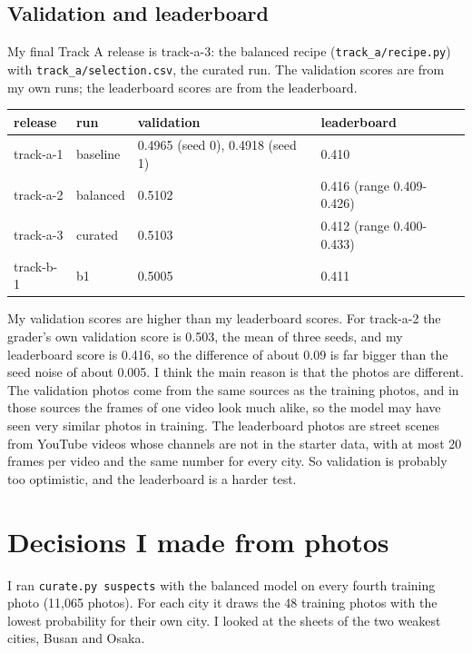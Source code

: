 \documentclass[11pt]{article}
\begin{document}
\subsection*{Validation and leaderboard}

My final Track A release is track-a-3: the balanced recipe
(\texttt{track\_a/recipe.py}) with \texttt{track\_a/selection.csv}, the
curated run. The validation scores are from my own runs; the leaderboard
scores are from the leaderboard.

\begin{center}\footnotesize
\begin{tabular}{llll}
\toprule
release & run & validation & leaderboard \\
\midrule
track-a-1 & baseline & 0.4965 (seed 0), 0.4918 (seed 1) & 0.410 \\
track-a-2 & balanced & 0.5102 & 0.416 (range 0.409-0.426) \\
track-a-3 & curated  & 0.5103 & 0.412 (range 0.400-0.433) \\
track-b-1 & b1       & 0.5005 & 0.411 \\
\bottomrule
\end{tabular}
\end{center}

My validation scores are higher than my leaderboard scores. For track-a-2 the grader's own validation score is 0.503, the mean of three seeds, and my leaderboard score is 0.416, so the difference of about 0.09 is far bigger than the seed noise of about 0.005. I think the main reason is that the photos are different. The validation photos come from the same sources as the training photos, and in those sources the frames of one video look much alike, so the model may have seen very similar photos in training. The leaderboard photos are street scenes from YouTube videos whose channels are not in the starter data, with at most 20 frames per video and the same number for every city. So validation is probably too optimistic, and the leaderboard is a harder test.

\section*{Decisions I made from photos}

I ran \texttt{curate.py suspects} with the balanced model on every fourth
training photo (11,065 photos). For each city it draws the 48 training photos
with the lowest probability for their own city. I looked at the sheets of the
two weakest cities, Busan and Osaka.
\end{document}
